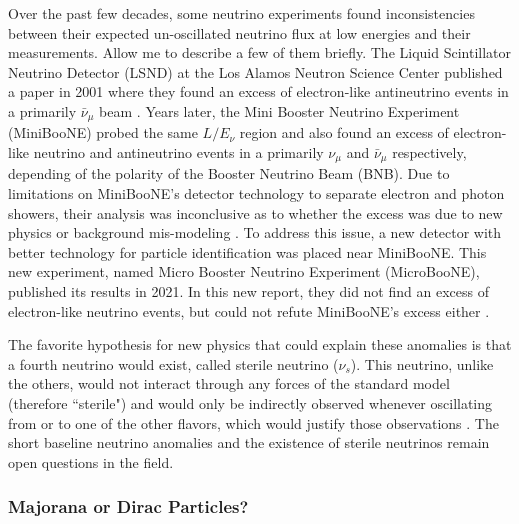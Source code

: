 Over the past few decades, some neutrino experiments found inconsistencies between their expected un-oscillated neutrino flux at low energies and their measurements. Allow me to describe a few of them briefly. The Liquid Scintillator Neutrino Detector (LSND) at the Los Alamos Neutron Science Center published a paper in 2001 where they found an excess of electron-like antineutrino events in a primarily $\bar{\nu}_{\mu}$ beam \cite{lsnd}. Years later, the Mini Booster Neutrino Experiment (MiniBooNE) probed the same $L/E_{\nu}$ region and also found an excess of electron-like neutrino and antineutrino events in a primarily $\nu_{\mu}$ and $\bar{\nu}_{\mu}$ respectively, depending of the polarity of the Booster Neutrino Beam (BNB). Due to limitations on MiniBooNE's detector technology to separate electron and photon showers, their analysis was inconclusive as to whether the excess was due to new physics or background mis-modeling \cite{miniboone}. To address this issue, a new detector with better technology for particle identification was placed near MiniBooNE. This new experiment, named Micro Booster Neutrino Experiment (MicroBooNE), published its results in 2021. In this new report, they did not find an excess of electron-like neutrino events, but could not refute MiniBooNE's excess either \cite{microboone_lee}. 

The favorite hypothesis for new physics that could explain these anomalies is that a fourth neutrino would exist, called sterile neutrino ($\nu_s$). This neutrino, unlike the others, would not interact through any forces of the standard model (therefore ``sterile") and would only be indirectly observed whenever oscillating from or to one of the other flavors, which would justify those observations \cite{Lauren_thesis}. 
The short baseline neutrino anomalies and the existence of sterile neutrinos remain open questions in the field. 

\subsubsection{Majorana or Dirac Particles?}

